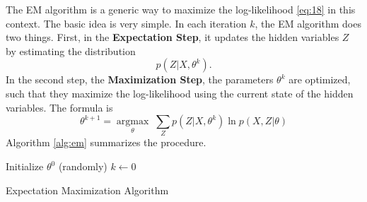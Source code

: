 The EM algorithm is a generic way to maximize the log-likelihood \eqref{eq:18} in this context.
The basic idea is very simple.
In each iteration $k$, the EM algorithm does two things.
First, in the \textbf{Expectation Step}, it updates the hidden variables $Z$ by estimating the distribution
\begin{equation}
  \label{eq:20}
  p(Z|X,\theta^k).
\end{equation}
In the second step, the \textbf{Maximization Step}, the parameters $\theta^k$ are optimized, such that they maximize the log-likelihood using the current state of the hidden variables. The formula is
\begin{equation}
  \label{eq:21}
  \theta^{k+1} = \underset{\theta}{\operatorname{argmax}}\; \sum_Zp(Z|X,\theta^k)\ln p(X,Z|\theta)
\end{equation}
Algorithm \ref{alg:em} summarizes the procedure.
\begin{algorithm}
  Initialize $\theta^0$ (randomly)\;
  $k\leftarrow 0$\;
  \caption{Expectation Maximization Algorithm}
  \label{alg:em}
\end{algorithm}
%
